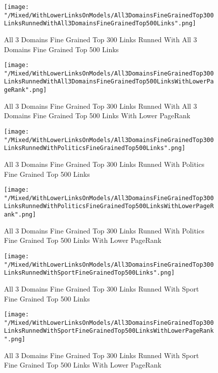 \documentclass[thesis=M,english]{FITthesis}[2018/05/30]
\begin{document}
	\begin{figure}\centering
		\texttt{[image: "/Mixed/WithLowerLinksOnModels/All3DomainsFineGrainedTop300LinksRunnedWithAll3DomainsFineGrainedTop500Links".png]}
		\caption{All 3 Domains Fine Grained Top 300 Links Runned With All 3 Domains Fine Grained Top 500 Links}\label{}
	\end{figure}
	
	\begin{figure}\centering
		\texttt{[image: "/Mixed/WithLowerLinksOnModels/All3DomainsFineGrainedTop300LinksRunnedWithAll3DomainsFineGrainedTop500LinksWithLowerPageRank".png]}
		\caption{All 3 Domains Fine Grained Top 300 Links Runned With All 3 Domains Fine Grained Top 500 Links With Lower PageRank}\label{}
	\end{figure}
	
	\begin{figure}\centering
		\texttt{[image: "/Mixed/WithLowerLinksOnModels/All3DomainsFineGrainedTop300LinksRunnedWithPoliticsFineGrainedTop500Links".png]}
		\caption{All 3 Domains Fine Grained Top 300 Links Runned With Politics Fine Grained Top 500 Links}\label{}
	\end{figure}
	
	\begin{figure}\centering
		\texttt{[image: "/Mixed/WithLowerLinksOnModels/All3DomainsFineGrainedTop300LinksRunnedWithPoliticsFineGrainedTop500LinksWithLowerPageRank".png]}
		\caption{All 3 Domains Fine Grained Top 300 Links Runned With Politics Fine Grained Top 500 Links With Lower PageRank}\label{}
	\end{figure}
	
	\begin{figure}\centering
		\texttt{[image: "/Mixed/WithLowerLinksOnModels/All3DomainsFineGrainedTop300LinksRunnedWithSportFineGrainedTop500Links".png]}
		\caption{All 3 Domains Fine Grained Top 300 Links Runned With Sport Fine Grained Top 500 Links}\label{}
	\end{figure}
	
	\begin{figure}\centering
		\texttt{[image: "/Mixed/WithLowerLinksOnModels/All3DomainsFineGrainedTop300LinksRunnedWithSportFineGrainedTop500LinksWithLowerPageRank".png]}
		\caption{All 3 Domains Fine Grained Top 300 Links Runned With Sport Fine Grained Top 500 Links With Lower PageRank}\label{}
	\end{figure}
	
\end{document}
